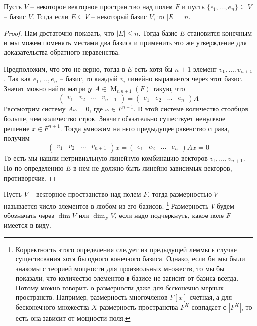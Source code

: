 \begin{claim}
\label{claim::DimWell}
Пусть $V$ -- некоторое векторное пространство над полем $F$ и пусть $\{e_1,\ldots,e_n\}\subseteq V$ -- базис $V$.
Тогда если $E\subseteq V$ -- некоторый базис $V$, то $|E| = n$.
\end{claim}
\begin{proof}
Нам достаточно показать, что $|E|\leqslant n$.
Тогда базис $E$ становится конечным и мы можем поменять местами два базиса и применить это же утверждение для доказательства обратного неравенства.

Предположим, что это не верно, тогда в $E$ есть хотя бы $n+1$ элемент $v_1,\ldots, v_{n+1}$.
Так как $e_1,\ldots, e_n$ -- базис, то каждый $v_i$ линейно выражается через этот базис.
Значит можно найти матрицу $A\in \operatorname{M}_{n\,n+1}(F)$ такую, что
\[
\begin{pmatrix}
{v_1}&{v_2}&{\ldots}&{v_{n+1}}
\end{pmatrix}
=
\begin{pmatrix}
{e_1}&{e_2}&{\ldots}&{e_n}
\end{pmatrix}
A
\]
Рассмотрим систему $Ax = 0$, где $x\in F^{n+1}$.
В этой системе количество столбцов больше, чем количество строк.
Значит обязательно существует ненулевое решение $x\in F^{n+1}$.
Тогда умножим на него предыдущее равенство справа, получим
\[
\begin{pmatrix}
{v_1}&{v_2}&{\ldots}&{v_{n+1}}
\end{pmatrix}x
=
\begin{pmatrix}
{e_1}&{e_2}&{\ldots}&{e_n}
\end{pmatrix}
Ax=
0
\]
То есть мы нашли нетривиальную линейную комбинацию векторов $v_1,\ldots, v_{n+1}$.
Но по определению $E$ в нем не должно быть линейно зависимых векторов, противоречие.
\end{proof}

\begin{definition}
\label{def::DimVec}
Пусть $V$ -- векторное пространство над полем $F$, тогда размерностью $V$ называется число элементов в любом из его базисов.%
\footnote{Корректность этого определения следует из предыдущей леммы в случае существования хотя бы одного конечного базиса.
Однако, если бы мы были знакомы с теорией мощности для произвольных множеств, то мы бы показали, что количество элементов в базисе не зависит от базиса всегда.
Потому можно говорить о размерности даже для бесконечно мерных пространств.
Например, размерность многочленов $F[x]$ счетная, а для бесконечного множества $X$ размерность пространства $F^X$ совпадает с $|F^X|$, то есть она зависит от мощности поля.}
Размерность $V$ будем обозначать через $\dim V$ или $\dim_F V$, если надо подчеркнуть, какое поле $F$ имеется в виду.
\end{definition}

